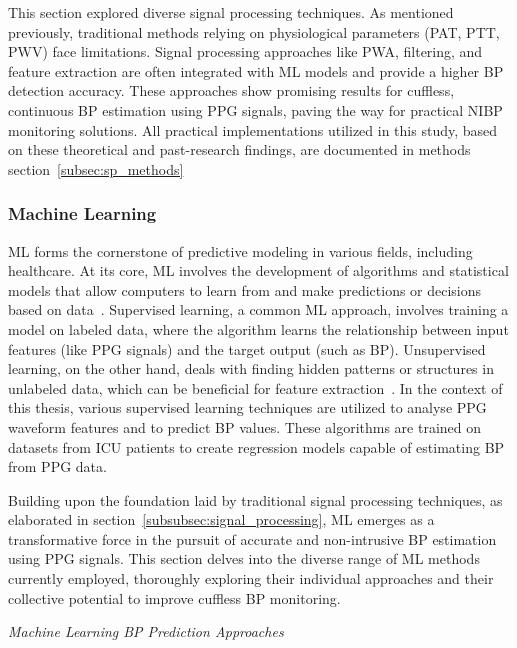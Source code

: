 \vspace{0.2cm}
This section explored diverse signal processing techniques.
As mentioned previously, traditional methods relying on physiological parameters (PAT, PTT, PWV) face limitations.
Signal processing approaches like PWA, filtering, and feature extraction are often integrated with ML models and provide a higher BP detection accuracy.
These approaches show promising results for cuffless, continuous BP estimation using PPG signals, paving the way for practical NIBP monitoring solutions.
All practical implementations utilized in this study, based on these theoretical and past-research findings, are documented in methods section~\ref{subsec:sp_methods}

\subsubsection{Machine Learning}
\label{subsubsec:machine_learning}
ML forms the cornerstone of predictive modeling in various fields, including healthcare.
At its core, ML involves the development of algorithms and statistical models that allow computers to learn from and make predictions or decisions based on data~\cite{WhatMachineLearning}.
Supervised learning, a common ML approach, involves training a model on labeled data, where the algorithm learns the relationship between input features (like PPG signals) and the target output (such as BP).
Unsupervised learning, on the other hand, deals with finding hidden patterns or structures in unlabeled data, which can be beneficial for feature extraction~\cite{deluaSupervisedVsUnsupervised2021}.
In the context of this thesis, various supervised learning techniques are utilized to analyse PPG waveform features and to predict BP values.
These algorithms are trained on datasets from ICU patients to create regression models capable of estimating BP from PPG data.

Building upon the foundation laid by traditional signal processing techniques, as elaborated in section~\ref{subsubsec:signal_processing}, ML emerges as a transformative force in the pursuit of accurate and non-intrusive BP estimation using PPG signals.
This section delves into the diverse range of ML methods currently employed, thoroughly exploring their individual approaches and their collective potential to improve cuffless BP monitoring.

\newpage

\textit{Machine Learning BP Prediction Approaches}
\vspace{0.2cm}

